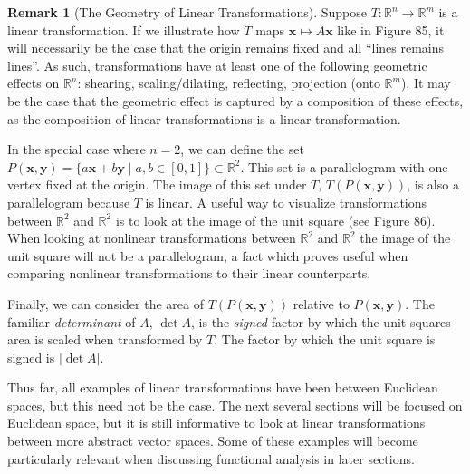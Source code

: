 \documentclass{article}
\newcommand{\R}{\mathbb{R}}
\newcommand{\x}{\mathbf{x}}
\newcommand{\y}{\mathbf{y}}
\newcommand{\abs}[1]{\left\lvert#1\right\rvert}
\theoremstyle{definition}
\newtheorem{remark}{Remark}[section]
\begin{document}
	\begin{remark}[The Geometry of Linear Transformations]
		Suppose $ T:\R^n\to\R^m $ is a linear transformation. If we illustrate how $ T $ maps $ \x\mapsto A\x $ like in Figure 85, it will necessarily be the case that the origin remains fixed and all ``lines remains lines''. As such, transformations have at least one of the following geometric effects on $ \R^n $: shearing, scaling/dilating, reflecting, projection (onto $ \R^m $). It may be the case that the geometric effect is captured by a composition of these effects, as the composition of linear transformations is a linear transformation. 
		\begin{figure}[h!]
			\centering
			\caption{}
		\end{figure}
		
		In the special case where $ n=2 $, we can define the set $ P(\x,\y)=\{a\x+b\y \mid a,b\in[0,1]\}\subset \R^2 $. This set is a parallelogram with one vertex fixed at the origin. The image of this set under $ T $, $ T(P(\x,\y)) $, is also a parallelogram because $ T $ is linear. A useful way to visualize transformations between $ \R^2 $ and $ \R^2 $ is to look at the image of the unit square (see Figure 86). When looking at nonlinear transformations between $ \R^2 $ and $ \R^2 $ the image of the unit square will not be a parallelogram, a fact which proves useful when comparing nonlinear transformations to their linear counterparts.
		
		Finally, we can consider the area of $ T(P(\x,\y)) $ relative to $ P(\x,\y) $. The familiar \textit{\color{red}determinant} of $ A $, $\det A$, is the \textit{signed} factor by which the unit squares area is scaled when transformed by $ T $.  The factor by which the unit square is signed is $\abs{\det A}$.
	\end{remark}
	Thus far, all examples of linear transformations have been between Euclidean spaces, but this need not be the case. The next several sections will be focused on Euclidean space, but it is still informative to look at linear transformations between more abstract vector spaces. Some of these examples will become particularly relevant when discussing functional analysis in later sections.
\end{document}
